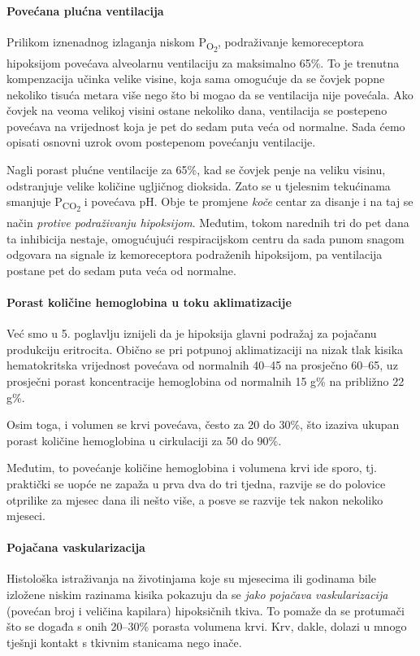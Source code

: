 \documentclass[12pt]{article}
\newcommand{\sub}[1]{\textsubscript{#1}}
\newcommand{\paro}{P\sub{O\sub{2}}}
\begin{document}
\paragraph{Povećana plućna ventilacija} Prilikom iznenadnog izlaganja niskom
\paro{}, podraživanje kemoreceptora hipoksijom povećava alveolarnu ventilaciju za
maksimalno 65\%. To je trenutna kompenzacija učinka velike visine, koja sama
omogućuje da se čovjek popne nekoliko tisuća metara više nego što bi mogao da se
ventilacija nije povećala. Ako čovjek na veoma velikoj visini ostane nekoliko
dana, ventilacija se postepeno povećava na vrijednost koja je pet do sedam puta
veća od normalne. Sada ćemo opisati osnovni uzrok ovom postepenom povećanju
ventilacije.

Nagli porast plućne ventilacije za 65\%, kad se čovjek penje na veliku visinu,
odstranjuje velike količine ugljičnog dioksida. Zato se u tjelesnim tekućinama
smanjuje P\textsubscript{CO\textsubscript{2}} i povećava pH. Obje te promjene
\emph{koče} centar za disanje i na taj se način \emph{protive podraživanju
    hipoksijom}. Međutim, tokom narednih tri do pet dana ta inhibicija nestaje,
omogućujući respiracijskom centru da sada punom snagom odgovara na signale iz
kemoreceptora podraženih hipoksijom, pa ventilacija postane pet do sedam puta
veća od normalne.

\paragraph{Porast količine hemoglobina u toku aklimatizacije} Već smo u  5.
poglavlju iznijeli da je hipoksija glavni podražaj za pojačanu produkciju
eritrocita. Obično se pri potpunoj aklimatizaciji na nizak tlak kisika
hematokritska vrijednost povećava od normalnih 40--45 na prosječno 60--65, uz
prosječni porast koncentracije hemoglobina od normalnih 15 g\% na približno 22
g\%.

Osim toga, i volumen se krvi povećava, često za 20 do 30\%, što izaziva ukupan
porast količine hemoglobina u cirkulaciji za 50 do 90\%.

Međutim, to povećanje količine hemoglobina i volumena krvi ide sporo, tj.
praktički se uopće ne zapaža u prva dva do tri tjedna, razvije se do polovice
otprilike za mjesec dana ili nešto više, a posve se razvije tek nakon nekoliko
mjeseci.

\paragraph{Pojačana vaskularizacija} Histološka istraživanja na životinjama koje
su mjesecima ili godinama bile izložene niskim razinama kisika pokazuju da se
\emph{jako pojačava vaskularizacija} (povećan broj i veličina kapilara)
hipoksičnih tkiva. To pomaže da se protumači što se događa s onih 20--30\%
porasta volumena krvi. Krv, dakle, dolazi u mnogo tješnji kontakt s tkivnim
stanicama nego inače.
\end{document}
